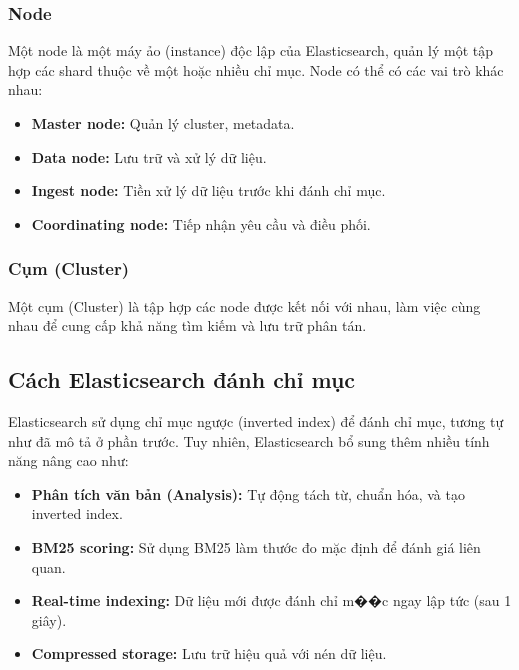 \documentclass[../BTL.tex]{subfiles}
\begin{document}
\subsubsection{Node}
Một node là một máy ảo (instance) độc lập của Elasticsearch, quản lý một tập hợp các shard thuộc về một hoặc nhiều chỉ mục. Node có thể có các vai trò khác nhau:
\begin{itemize}
    \item \textbf{Master node:} Quản lý cluster, metadata.
    
    \item \textbf{Data node:} Lưu trữ và xử lý dữ liệu.
    
    \item \textbf{Ingest node:} Tiền xử lý dữ liệu trước khi đánh chỉ mục.
    
    \item \textbf{Coordinating node:} Tiếp nhận yêu cầu và điều phối.
\end{itemize}

\subsubsection{Cụm (Cluster)}
Một cụm (Cluster) là tập hợp các node được kết nối với nhau, làm việc cùng nhau để cung cấp khả năng tìm kiếm và lưu trữ phân tán.

\subsection{Cách Elasticsearch đánh chỉ mục}
Elasticsearch sử dụng chỉ mục ngược (inverted index) để đánh chỉ mục, tương tự như đã mô tả ở phần trước. Tuy nhiên, Elasticsearch bổ sung thêm nhiều tính năng nâng cao như:
\begin{itemize}
    \item \textbf{Phân tích văn bản (Analysis):} Tự động tách từ, chuẩn hóa, và tạo inverted index.
    
    \item \textbf{BM25 scoring:} Sử dụng BM25 làm thước đo mặc định để đánh giá liên quan.
    
    \item \textbf{Real-time indexing:} Dữ liệu mới được đánh chỉ m��c ngay lập tức (sau 1 giây).
    
    \item \textbf{Compressed storage:} Lưu trữ hiệu quả với nén dữ liệu.
\end{itemize}
\end{document}
